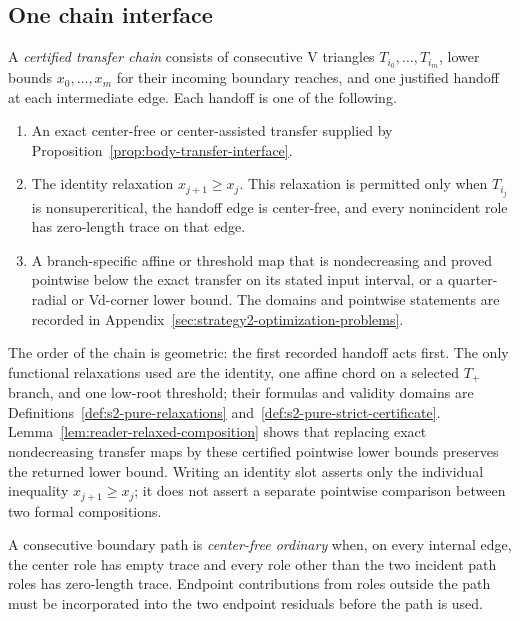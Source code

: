 \subsection{One chain interface}

\begin{definition}
\label{def:body-chain-notation}
\label{def:body-six-slot-chain}
A \emph{certified transfer chain} consists of consecutive V triangles
$T_{i_0},\ldots,T_{i_m}$, lower bounds
$x_0,\ldots,x_m$ for their incoming boundary reaches, and one justified
handoff at each intermediate edge.  Each handoff is one of the following.

\begin{enumerate}
\item An exact center-free or center-assisted transfer supplied by
Proposition~\ref{prop:body-transfer-interface}.
\item The identity relaxation $x_{j+1}\ge x_j$.  This relaxation is permitted
only when $T_{i_j}$ is nonsupercritical, the handoff edge is center-free, and
every nonincident role has zero-length trace on that edge.
\item A branch-specific affine or threshold map that is nondecreasing and
proved pointwise below the exact transfer on its stated input interval, or a
quarter-radial or Vd-corner lower bound.  The domains and pointwise statements
are recorded in Appendix~\ref{sec:strategy2-optimization-problems}.
\end{enumerate}

The order of the chain is geometric: the first recorded handoff acts first.
The only functional relaxations used are the identity, one affine chord on a
selected $T_+$ branch, and one low-root threshold; their formulas and validity
domains are Definitions~\ref{def:s2-pure-relaxations}
and~\ref{def:s2-pure-strict-certificate}.  Lemma~\ref{lem:reader-relaxed-composition}
shows that replacing exact nondecreasing transfer maps by these certified
pointwise lower bounds preserves the returned lower bound.
Writing an identity slot asserts only the individual inequality
$x_{j+1}\ge x_j$; it does not assert a separate pointwise comparison between
two formal compositions.
\end{definition}

\begin{definition}
\label{def:body-center-free-path}
A consecutive boundary path is \emph{center-free ordinary} when, on every
internal edge, the center role has empty trace and every role other than the
two incident path roles has zero-length trace.  Endpoint contributions from
roles outside the path must be incorporated into the two endpoint residuals
before the path is used.
\end{definition}

